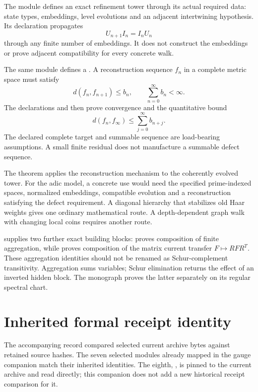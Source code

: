The module  defines an exact refinement tower through its actual required data: state types, embeddings, level evolutions and an adjacent intertwining hypothesis. Its declaration  propagates
\[
 U_{n+1}I_n=I_nU_n
\]
through any finite number of embeddings. It does not construct the embeddings or prove adjacent compatibility for every concrete walk.

The same module defines a . A reconstruction sequence \(f_n\) in a complete metric space must satisfy
\[
 d(f_n,f_{n+1})\le b_n,
 \qquad \sum_{n=0}^{\infty}b_n<\infty.
\]
The declarations  and  then prove convergence and the quantitative bound
\[
 d(f_n,f_\infty)
 \le\sum_{j=0}^{\infty}b_{n+j}.
\]
The declared complete target and summable sequence are load-bearing assumptions. A small finite residual does not manufacture a summable defect sequence.

The theorem  applies the reconstruction mechanism to the coherently evolved tower. For the adic model, a concrete use would need the specified prime-indexed spaces, normalized embeddings, compatible evolution and a reconstruction satisfying the defect requirement. A diagonal hierarchy that stabilizes old Haar weights gives one ordinary mathematical route. A depth-dependent graph walk with changing local coins requires another route.

 supplies two further exact building blocks:  proves composition of finite aggregation, while  proves composition of the matrix current transfer \(F\mapsto RFR^T\). These aggregation identities should not be renamed as Schur-complement transitivity. Aggregation sums variables; Schur elimination returns the effect of an inverted hidden block. The monograph proves the latter separately on its regular spectral chart.

\clearpage
\section{Inherited formal receipt identity}\label{a-verify-receipts}

The accompanying record compared selected current archive bytes against retained source hashes. The seven selected modules already mapped in the gauge companion match their inherited identities. The eighth, , is pinned to the current archive and read directly; this companion does not add a new historical receipt comparison for it.

